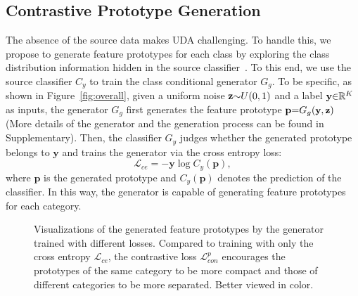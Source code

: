 \documentclass{article}
\begin{document}
\subsection{Contrastive Prototype Generation}\label{stage1}
The absence of the source data makes UDA challenging. To handle this, we propose to generate feature prototypes for each class by exploring the class distribution information hidden in the source classifier~\cite{Xu2020GenerativeLD}. To this end, we use the source classifier $C_{y}$  to train the class conditional generator $G_{g}$. 
To be specific, as shown in Figure~\ref{fig:overall}, given a uniform noise $\textbf{z}\small{\sim} U(0,1)$ and a label $\textbf{y}\small{\in}\mathbb{R}^K$ as inputs, the generator $G_{g}$ first generates the feature prototype $\textbf{p} \small{=} G_{g}(\textbf{y},\textbf{z})$ (More details of the generator and the generation process can be found in Supplementary). Then, the classifier $G_y$ judges whether the generated prototype belongs to $\textbf{y}$ and trains the generator via the cross entropy loss:
\begin{equation}
\label{eq:ce}
\mathcal{L}_{ce} = -\textbf{y}\log C_{y}(\textbf{p}),
\end{equation}
where $\textbf{p}$ is the generated prototype and $C_{y}(\textbf{p})$ denotes the prediction of the classifier.
In this way, the generator is capable of generating feature prototypes for each category.  

\begin{figure}[t]
\centering
\begin{minipage}{0.49\linewidth}
\end{minipage}
\begin{minipage}{0.49\linewidth}
\end{minipage}
\label{figdata}
\caption{Visualizations of the generated feature prototypes by the generator  trained with different losses. Compared to training with only the cross entropy   $\mathcal{L}_{ce}$, the contrastive loss $\mathcal{L}_{con}^{p}$
encourages the prototypes of the same category to be more compact and those of different categories to be more separated. Better viewed in color.}
\label{vis:lce_total}
\end{figure}
\end{document}
